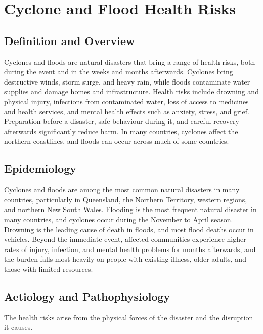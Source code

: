 \chapter{Cyclone and Flood Health Risks}

\section*{Definition and Overview}
Cyclones and floods are natural disasters that bring a range of health risks, both during the event and in the weeks and months afterwards. Cyclones bring destructive winds, storm surge, and heavy rain, while floods contaminate water supplies and damage homes and infrastructure. Health risks include drowning and physical injury, infections from contaminated water, loss of access to medicines and health services, and mental health effects such as anxiety, stress, and grief. Preparation before a disaster, safe behaviour during it, and careful recovery afterwards significantly reduce harm. In many countries, cyclones affect the northern coastlines, and floods can occur across much of some countries.

\section*{Epidemiology}
Cyclones and floods are among the most common natural disasters in many countries, particularly in Queensland, the Northern Territory, western regions, and northern New South Wales. Flooding is the most frequent natural disaster in many countries, and cyclones occur during the November to April season. Drowning is the leading cause of death in floods, and most flood deaths occur in vehicles. Beyond the immediate event, affected communities experience higher rates of injury, infection, and mental health problems for months afterwards, and the burden falls most heavily on people with existing illness, older adults, and those with limited resources.

\section*{Aetiology and Pathophysiology}
The health risks arise from the physical forces of the disaster and the disruption it causes.

